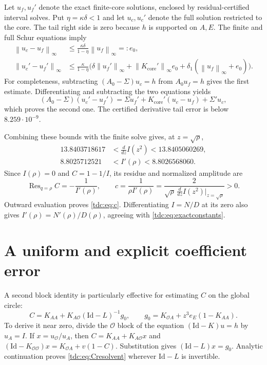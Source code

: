\documentclass[11pt]{article}
\theoremstyle{definition}\newtheorem{definition}[theorem]{Definition}
\theoremstyle{remark}\newtheorem{remark}[theorem]{Remark}
\newcommand{\Id}{\mathrm{Id}}
\newcommand{\OO}{\mathcal O}
\newcommand{\norm}[1]{\left\lVert#1\right\rVert}
\DeclareMathOperator{\Res}{Res}
\begin{document}
Let $u_f,u_f'$ denote the exact finite-core solutions, enclosed by residual-certified interval solves. Put $\eta=\kappa\delta<1$ and let $u_c,u_c'$ denote the full solution restricted to the core. The tail right side is zero because $h$ is supported on $A,E$. The finite and full Schur equations imply
\begin{align}
 \norm{u_c-u_f}_\infty&\le
 \frac{\kappa\delta}{1-\eta}\norm{u_f}_\infty=:e_0,\label{tdc:eq:uerror}\\
 \norm{u_c'-u_f'}_\infty&\le\frac{\kappa}{1-\eta}
 \bigl(\delta\norm{u_f'}_\infty+
 \norm{K_{\mathrm{core}}'}_\infty e_0+
 \delta_1(\norm{u_f}_\infty+e_0)\bigr).
 \label{tdc:eq:duerror}
\end{align}
For completeness, subtracting $(A_0-\Sigma)u_c=h$ from $A_0u_f=h$ gives the first estimate. Differentiating and subtracting the two equations yields
\[
 (A_0-\Sigma)(u_c'-u_f')=
 \Sigma u_f'+K_{\mathrm{core}}'(u_c-u_f)+\Sigma'u_c,
\]
which proves the second one. The certified derivative tail error is below $8.259\cdot10^{-9}$.

Combining these bounds with the finite solve gives, at $z=\sqrt\rho$,
\begin{align}
 13.8403718617&<\frac{d}{dz}I(z^2)<13.8405060269,\label{tdc:eq:Iz}\\
 8.8025712521&<I'(\rho)<8.8026568060.\label{tdc:eq:Iq}
\end{align}
Since $I(\rho)=0$ and $C=1-1/I$, its residue and normalized amplitude are
\begin{equation}\label{tdc:eq:amplitude}
 \Res_{q=\rho}C=-\frac1{I'(\rho)},\qquad
 c=\frac1{\rho I'(\rho)}
 =\frac{2}{\sqrt\rho\,\frac{d}{dz}I(z^2)|_{z=\sqrt\rho}}>0.
\end{equation}
Outward evaluation proves \eqref{tdc:eq:c}. Differentiating $I=N/D$ at its zero also gives $I'(\rho)=N'(\rho)/D(\rho)$, agreeing with \eqref{tdc:eq:exactconstants}.

\section{A uniform and explicit coefficient error}
\label{tdc:sec:error}
A second block identity is particularly effective for estimating $C$ on the global circle:
\begin{equation}\label{tdc:eq:Cresolvent}
 C=K_{AA}+K_{A\OO}(\Id-L)^{-1}g_0,
 \qquad g_0=K_{\OO A}+z^3e_E(1-K_{AA}).
\end{equation}
To derive it near zero, divide the $\OO$ block of the equation
$(\Id-K)u=h$ by $u_A=I$. If $x=u_{\OO}/u_A$, then
$C=K_{AA}+K_{A\OO}x$ and
$(\Id-K_{\OO\OO})x=K_{\OO A}+v(1-C)$.
Substitution gives $(\Id-L)x=g_0$. Analytic continuation proves \eqref{tdc:eq:Cresolvent} wherever $\Id-L$ is invertible.
\end{document}
